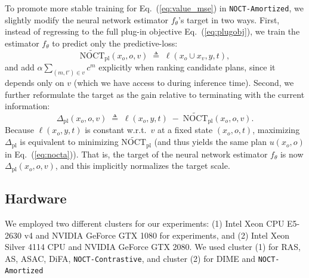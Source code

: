 
To promote more stable training for Eq.~(\ref{eq:value_mse}) in \texttt{NOCT-Amortized}, we slightly modify the neural network estimator $f_\theta$'s target in two ways. First, instead of regressing to the full plug-in objective Eq.~(\ref{eq:plugobj}), we train the estimator $f_\theta$ to predict only the predictive-loss:
\begin{equation}
\label{eq:nocta_pl_loss_only}
\widetilde{\mathrm{NOCT}}_{\mathrm{pl}}(x_o,o,v)\;\triangleq\;\ell(x_o\cup x_v, y, t),
\end{equation}
and add $\alpha\sum_{(m,t')\in v} c^m$ explicitly when ranking candidate plans, since it depends only on $v$ (which we have access to during inference time). Second, we further reformulate the target as the gain relative to terminating with the current information:
\begin{equation}
\label{eq:delta_pl}
\Delta_{\mathrm{pl}}(x_o,o,v)\;\triangleq\;\ell(x_o, y, t)\;-\;\widetilde{\mathrm{NOCT}}_{\mathrm{pl}}(x_o,o,v).
\end{equation}
Because $\ell(x_o,y,t)$ is constant w.r.t.\ $v$ at a fixed state $(x_o,o,t)$, maximizing $\Delta_{\mathrm{pl}}$ is equivalent to minimizing $\widetilde{\mathrm{NOCT}}_{\mathrm{pl}}$ (and thus yields the same plan $u(x_o, o)$ in Eq.~(\ref{eq:nocta})). That is, the target of the neural network estimator $f_\theta$ is now $\Delta_{\mathrm{pl}}(x_o,o,v)$, and this implicitly normalizes the target scale. 


\subsection{Hardware} \label{sec:hardware}
We employed two different clusters for our experiments: (1) Intel Xeon CPU E5-2630 v4 and NVIDIA GeForce GTX 1080 for experiments, and (2) Intel Xeon Silver 4114 CPU and NVIDIA GeForce GTX 2080. We used cluster (1) for RAS, AS, ASAC, DiFA, \texttt{NOCT-Contrastive}, and cluster (2) for DIME and \texttt{NOCT-Amortized}

